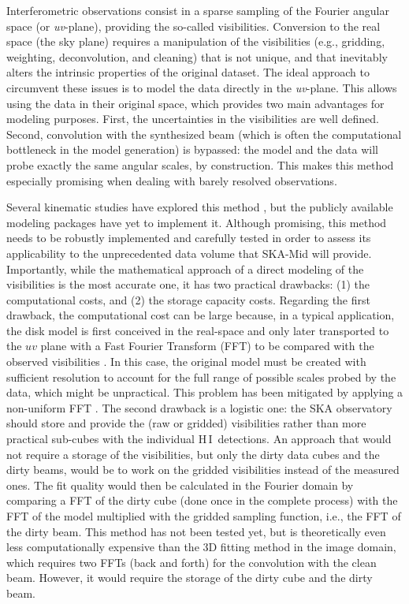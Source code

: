 \documentclass[a4paper,11pt]{article}
\newcommand{\hi } {{\rm H}\,{\small\rm I}}
\begin{document}
Interferometric observations consist in a sparse sampling of the Fourier angular space (or \emph{uv}-plane), providing the so-called visibilities.
Conversion to the real space (the sky plane) requires a manipulation of the visibilities (e.g., gridding, weighting, deconvolution, and cleaning) that is not unique, and that inevitably alters the intrinsic properties of the original dataset. The ideal approach to circumvent these issues is to model the data directly in the \emph{uv}-plane. This allows using the data in their original space, which provides two main advantages for modeling purposes. First, the uncertainties in the visibilities are well defined.
Second, convolution with the synthesized beam (which is often the computational bottleneck in the model generation) is bypassed: the model and the data will probe exactly the same angular scales, by construction. This makes this method especially promising when dealing with barely resolved observations.

Several kinematic studies have explored this method \citep[e.g.,][]{Dye2018, Rizzo20, Powell21, Amvrosiadis25}, but the publicly available modeling packages have yet to implement it. Although promising, this method needs to be robustly implemented and carefully tested in order to assess its applicability to the unprecedented data volume that SKA-Mid will provide. Importantly, while the mathematical approach of a direct modeling of the visibilities is the most accurate one, it has two practical drawbacks: (1) the computational costs, and (2) the storage capacity costs. Regarding the first drawback, the computational cost can be large because, in a typical application, the disk model is first conceived in the real-space and only later transported to the $uv$ plane with a Fast Fourier Transform (FFT) to be compared with the observed visibilities \citep[e.g.,][]{Amvrosiadis25}.
In this case, the original model must be created with sufficient resolution to account for the full range of possible scales probed by the data, which might be unpractical. This problem has been mitigated by applying a non-uniform FFT \citep{Rizzo20, Powell21}. The second drawback is a logistic one: the SKA observatory should store and provide the (raw or gridded) visibilities rather than more practical sub-cubes with the individual \hi\ detections. An approach that would not require a storage of the visibilities, but only the dirty data cubes and the dirty beams, would be to work on the gridded visibilities instead of the measured ones. The fit quality would then be calculated in the Fourier domain by comparing a FFT of the dirty cube (done once in the complete process) with the FFT of the model multiplied with the gridded sampling function, i.e., the FFT of the dirty beam. This method has not been tested yet, but is theoretically even less computationally expensive than the 3D fitting method in the image domain, which requires two FFTs (back and forth) for the convolution with the clean beam. However, it would require the storage of the dirty cube and the dirty beam.
\end{document}
